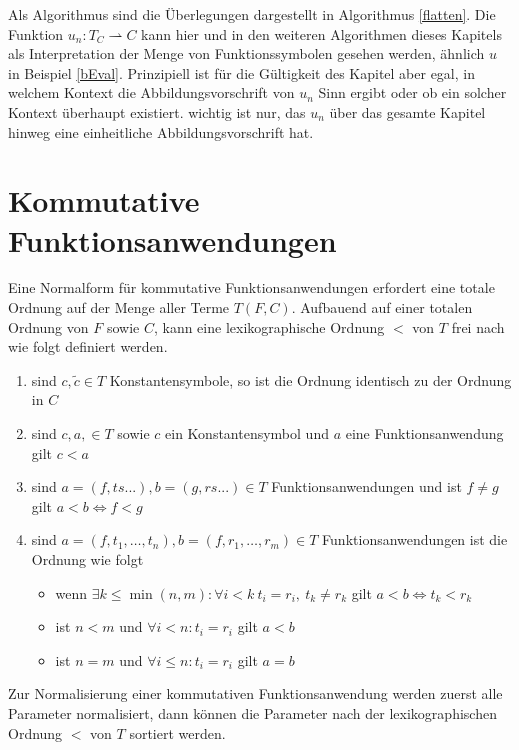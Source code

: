 Als Algorithmus sind die Überlegungen dargestellt in Algorithmus \ref{flatten}.
Die Funktion $u_n \colon T_C \rightharpoonup C$ kann hier und in den weiteren Algorithmen dieses Kapitels als \grqq{} Interpretation der Menge von Funktionssymbolen gesehen werden, ähnlich $u$ in Beispiel \ref{bEval}. Prinzipiell ist für die Gültigkeit des Kapitel aber egal, in welchem Kontext die Abbildungsvorschrift von $u_n$ Sinn ergibt oder ob ein solcher Kontext überhaupt existiert. wichtig ist nur, das $u_n$ über das gesamte Kapitel hinweg eine einheitliche Abbildungsvorschrift hat.

\begin{algorithm}
\DontPrintSemicolon
\caption{$\mathrm{flatten} \colon T \rightarrow T$}\label{flatten}

\end{algorithm}

\section{Kommutative Funktionsanwendungen} \label{subsecNormalSortieren}
Eine Normalform für kommutative Funktionsanwendungen erfordert eine totale Ordnung auf der Menge aller Terme $T(F, C)$. Aufbauend auf einer totalen Ordnung von $F$ sowie $C$, kann eine lexikographische Ordnung $<$ von $T$ frei nach \cite{LexikografischeOrdnung} wie folgt definiert werden. 
\begin{enumerate}
	\item{sind $c, \tilde{c} \in T$ Konstantensymbole, so ist die Ordnung identisch zu der Ordnung in $C$}
	\item{sind $c, a, \in T$ sowie $c$ ein Konstantensymbol und $a$ eine Funktionsanwendung gilt $c < a$ }
	\item{sind $a = (f, ts...), b = (g, rs...) \in T$ Funktionsanwendungen und ist $f \neq g$ gilt $a < b \iff f < g $}
	\item{sind $a = (f, t_1, \dots, t_n), b = (f, r_1, \dots, r_m) \in T$ Funktionsanwendungen ist die Ordnung wie folgt}
	\begin{itemize}
		\item{wenn $\exists k \leq \min{(n, m)} \colon \forall i < k ~ t_i = r_i ,~ t_k \neq r_k $ gilt ${a < b \iff t_k < r_k}$}
		\item{ist $n < m$ und $\forall i < n\colon t_i = r_i$ gilt $a < b$}
		\item{ist $n = m$ und $\forall i \leq n\colon t_i = r_i$ gilt $a = b$}
	\end{itemize}
\end{enumerate}
Zur Normalisierung einer kommutativen Funktionsanwendung werden zuerst alle Parameter normalisiert, dann können die Parameter nach der lexikographischen Ordnung $<$ von $T$ sortiert werden. 

